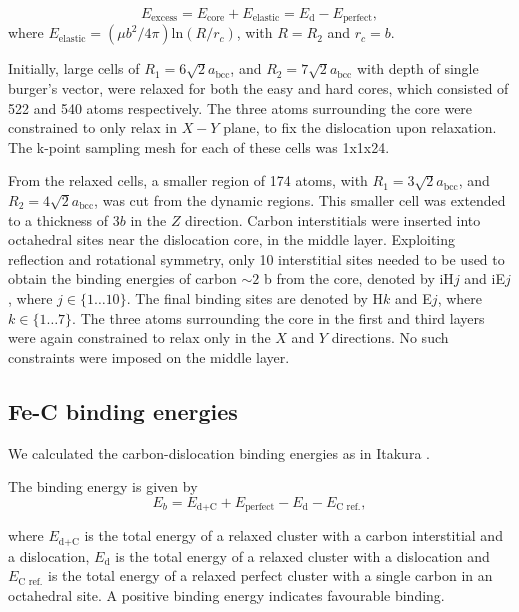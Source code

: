 \documentclass[a4paper,11pt]{article}
\begin{document}
\begin{equation}
 E_{\text{excess}} =   E_{\text{core}} + E_{\text{elastic}} = E_{\text{d}} - E_{\text{perfect}}   ,\label{eq:excessenergy}
 \end{equation} 
where
\(E_{\text{elastic}} = ( \mu b^2 / 4\pi )\text{ln}(R/ r_c)\), with \(R = R_2\) and \(r_c = b\).

Initially, large cells of \(R_1 = 6\sqrt{2}a_{\text{bcc}}\), and \(R_2 =
   7\sqrt{2}a_{\text{bcc}}\) with depth of single burger's vector, were relaxed
for both the easy and hard cores, which consisted of 522 and 540 atoms
respectively. The three atoms surrounding the core were constrained to only
relax in \(X-Y\) plane, to fix the dislocation upon relaxation. 
The k-point sampling mesh for each of these cells was 1x1x24.

From the relaxed cells, a smaller region of 174 atoms, with \(R_1 = 3\sqrt{2}a_{\text{bcc}}\), and \(R_2
   = 4\sqrt{2}a_{\text{bcc}}\), was cut from the dynamic regions. This smaller cell was extended to a
thickness of 3\(b\) in the \(Z\) direction. Carbon interstitials were inserted into octahedral sites
near the dislocation core, in the middle layer. Exploiting reflection and rotational symmetry,
only 10 interstitial sites needed to be used to obtain the binding energies of carbon \(\sim2\) b from
the core, denoted by iH\(j\) and iE\(j\), where \(j \in \{1\dots10\}\). The final binding sites are denoted
by H\(k\) and E\(j\), where \(k \in \{1\dots7\}\). The three atoms surrounding the core in the first and
third layers were again constrained to relax only in the \(X\) and \(Y\) directions. No such
constraints were imposed on the middle layer.


\subsection{Fe-C binding energies}
\label{sec:org05e294f}
We calculated the carbon-dislocation binding energies as in Itakura
 \cite{itakura13_effec_hydrog_atoms_screw_disloc}.

The binding energy is given by 
\begin{equation}  
E_b = E_{\text{d+C}} + E_{\text{perfect}}- E_{\text{d}} - E_{\text{C ref.}},    
\end{equation}

where \(E_{\text{d+C}}\) is the total energy of a relaxed cluster with a
carbon interstitial and a dislocation, \(E_{\text{d}}\) is the total
energy of a relaxed cluster with a dislocation and \(E_{\text{C
    ref.}}\) is the total energy of a relaxed perfect cluster with a single carbon in
an octahedral site. A positive binding energy indicates favourable binding.
\end{document}
